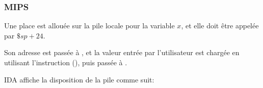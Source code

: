 \subsubsection{MIPS}

Une place est allouée sur la pile locale pour la variable $x$, et elle doit être appelée par $\$sp+24$.

Son adresse est passée à \scanf, et la valeur entrée par l'utilisateur est chargée en utilisant
l'instruction  (), puis passée à \printf.



IDA affiche la disposition de la pile comme suit:



